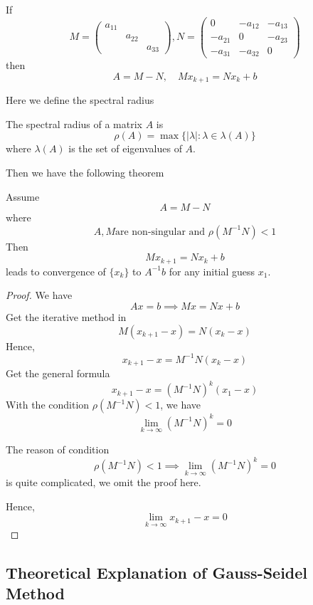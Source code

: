 If \[
    M = \begin{pmatrix}
    a_{11} && \\
& a_{22} & \\
&& a_{33}
  \end{pmatrix}, N = \begin{pmatrix}
  0 & -a_{12} & -a_{13} \\
 -a_{21} & 0 & -a_{23} \\
-a_{31} & -a_{32} & 0
\end{pmatrix}
\]
then \[
    A = M - N, \quad Mx_{k+1} = Nx_{k} + b
\]

Here we define the spectral radius

\begin{definition}
    The spectral radius of a matrix $A$ is \[
    \rho(A) = \max\{|\lambda|: \lambda \in \lambda(A)\}
    \]
    where $\lambda(A)$ is the set of eigenvalues of $A$.
\end{definition}

Then we have the following theorem 
\begin{theorem}
    Assume \[
        A = M - N
    \]
    where \[
        A, M \mbox{are non-singular and } \rho(M^{-1}N) < 1
    \]
    Then \[
        M x_{k+1} = Nx_k + b
    \]
    leads to convergence of $\{x_k\}$ to $A^{-1}b$ for any initial guess $x_1$.
\end{theorem}
\begin{proof}
    We have \[
        Ax = b \implies Mx = Nx + b
    \]
    Get the iterative method in \[
        M(x_{k+1} - x) = N(x_k - x)
    \]
    Hence, \[
        x_{k+1} - x = M^{-1}N(x_k - x)
    \]
    Get the general formula 
    \[
        x_{k+1} - x = (M^{-1}N)^{k}(x_1 - x)
    \]
    With the condition $\rho(M^{-1}N) < 1$, we have \[
        \lim_{k \to \infty} (M^{-1}N)^k = 0
    \]

\begin{note}
    The reason of condition \[
        \rho(M^{-1}N) < 1 \implies \lim_{k \to \infty} (M^{-1}N)^k = 0
    \] 
    is quite complicated, we omit the proof here.
\end{note}

    Hence, \[
        \lim_{k \to \infty} x_{k+1} - x = 0
    \]
\end{proof}

\subsection{Theoretical Explanation of Gauss-Seidel Method}

